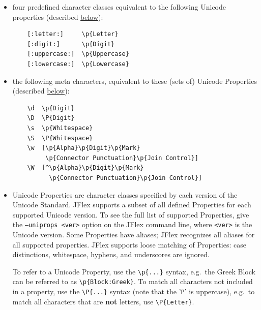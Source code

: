 \begin{itemize}
\begin{itemize}
\begin{verbatim}
    [:jletter:]       isJavaIdentifierStart()
    [:jletterdigit:]  isJavaIdentifierPart()
\end{verbatim}
  \item
    four predefined character classes equivalent to the following
    Unicode properties (described \hyperref[unipropsyntax]{below}):

\begin{verbatim}
    [:letter:]     \p{Letter}
    [:digit:]      \p{Digit}
    [:uppercase:]  \p{Uppercase}
    [:lowercase:]  \p{Lowercase}
\end{verbatim}
  \item
    the following meta characters, equivalent to these (sets of) Unicode
    Properties (described \hyperref[unipropsyntax]{below}):

\begin{verbatim}
    \d  \p{Digit}
    \D  \P{Digit}
    \s  \p{Whitespace}
    \S  \P{Whitespace}
    \w  [\p{Alpha}\p{Digit}\p{Mark}
         \p{Connector Punctuation}\p{Join Control}]
    \W  [^\p{Alpha}\p{Digit}\p{Mark}
          \p{Connector Punctuation}\p{Join Control}]
\end{verbatim}
  \item
    \label{unipropsyntax} Unicode Properties are character classes
    specified by each version of the Unicode Standard. JFlex supports a
    subset of all defined Properties for each supported Unicode version.
    To see the full list of supported Properties, give the
    \texttt{–uniprops\ \textless{}ver\textgreater{}} option on the JFlex
    command line, where \texttt{\textless{}ver\textgreater{}} is the
    Unicode version. Some Properties have aliases; JFlex recognizes all
    aliases for all supported properties. JFlex supports loose matching
    of Properties: case distinctions, whitespace, hyphens, and
    underscores are ignored.

    To refer to a Unicode Property, use the
    \texttt{\textbackslash{}p\{...\}} syntax, e.g.~the Greek Block can
    be referred to as \texttt{\textbackslash{}p\{Block:Greek\}}. To
    match all characters not included in a property, use the
    \texttt{\textbackslash{}P\{...\}} syntax (note that the '\texttt{P}'
    is uppercase), e.g.~to match all characters that are \textbf{not}
    letters, use \texttt{\textbackslash{}P\{Letter\}}.


\end{itemize}
\end{itemize}
